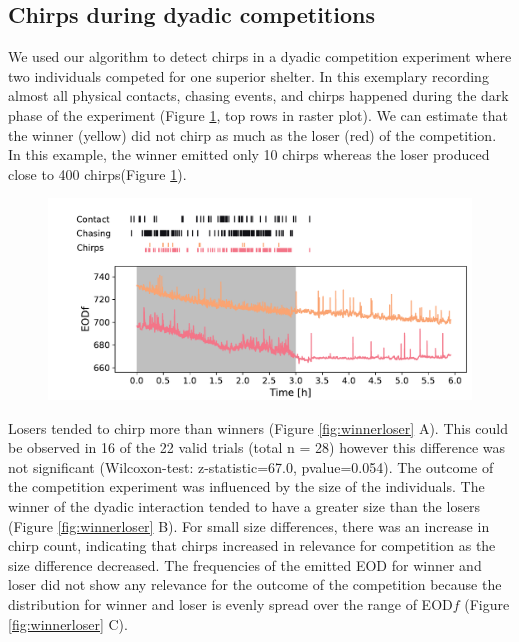 \subsection{Chirps during dyadic competitions}

We used our algorithm to detect chirps in a dyadic competition experiment where two individuals competed for one superior shelter. In this exemplary recording almost all physical contacts, chasing events, and chirps happened during the dark phase of the experiment (Figure \ref{fig:timeline}, top rows in raster plot). We can estimate that the winner (yellow) did not chirp as much as the loser (red) of the competition. In this example, the winner emitted only 10 chirps whereas the loser produced close to 400 chirps(Figure \ref{fig:timeline}).
\begin{figure}[H]
    \centering
    \includegraphics[width=\linewidth]{figures/timeline.pdf}
    \label{fig:timeline}
\end{figure}

Losers tended to chirp more than winners (Figure \ref{fig:winnerloser} A). This could be observed in 16 of the 22 valid trials (total n = 28) however this difference was not significant (Wilcoxon-test: z-statistic=67.0, pvalue=0.054). The outcome of the competition experiment was influenced by the size of the individuals. The winner of the dyadic interaction tended to have a greater size than the losers (Figure \ref{fig:winnerloser} B). For small size differences, there was an increase in chirp count, indicating that chirps increased in relevance for competition as the size difference decreased. The frequencies of the emitted EOD for winner and loser did not show any relevance for the outcome of the competition because the distribution for winner and loser is evenly spread over the range of EOD$f$ (Figure \ref{fig:winnerloser} C). 

